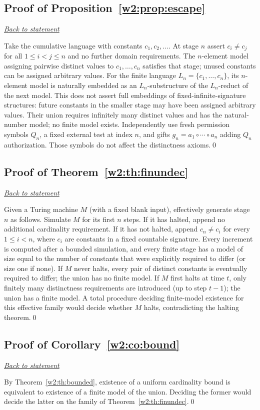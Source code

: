 \documentclass[11pt,letterpaper]{article}
\theoremstyle{definition}\newtheorem{definition}[theorem]{Definition}\newtheorem{example}[theorem]{Example}
\theoremstyle{remark}\newtheorem{remark}[theorem]{Remark}
\newcommand{\backlink}[1]{\noindent\hyperref[#1]{\textit{Back to statement}}\par\smallskip}
\begin{document}
\subsection{Proof of Proposition~\ref{w2:prop:escape}}\label{w2:pr:escape}\backlink{w2:prop:escape}
Take the cumulative language with constants $c_1,c_2,\dots$. At stage $n$ assert $c_i\ne c_j$ for all $1\le i<j\le n$ and no further domain requirements. The $n$-element model assigning pairwise distinct values to $c_1,\dots,c_n$ satisfies that stage; unused constants can be assigned arbitrary values. For the finite language $L_n=\{c_1,\dots,c_n\}$, its $n$-element model is naturally embedded as an $L_n$-substructure of the $L_n$-reduct of the next model. This does not assert full embeddings of fixed-infinite-signature structures: future constants in the smaller stage may have been assigned arbitrary values. Their union requires infinitely many distinct values and has the natural-number model; no finite model exists. Independently use fresh permission symbols $Q_n$, a fixed external test at index $n$, and gifts $g_n=a_1\circ\cdots\circ a_n$ adding $Q_n$ authorization. Those symbols do not affect the distinctness axioms.\qed

\subsection{Proof of Theorem~\ref{w2:th:finundec}}\label{w2:pr:finundec}\backlink{w2:th:finundec}
Given a Turing machine $M$ (with a fixed blank input), effectively generate stage $n$ as follows. Simulate $M$ for its first $n$ steps. If it has halted, append no additional cardinality requirement. If it has not halted, append $c_n\ne c_i$ for every $1\le i<n$, where $c_i$ are constants in a fixed countable signature. Every increment is computed after a bounded simulation, and every finite stage has a model of size equal to the number of constants that were explicitly required to differ (or size one if none). If $M$ never halts, every pair of distinct constants is eventually required to differ; the union has no finite model. If $M$ first halts at time $t$, only finitely many distinctness requirements are introduced (up to step $t-1$); the union has a finite model. A total procedure deciding finite-model existence for this effective family would decide whether $M$ halts, contradicting the halting theorem.\qed

\subsection{Proof of Corollary~\ref{w2:co:bound}}\label{w2:pr:bound}\backlink{w2:co:bound}
By Theorem~\ref{w2:th:bounded}, existence of a uniform cardinality bound is equivalent to existence of a finite model of the union. Deciding the former would decide the latter on the family of Theorem~\ref{w2:th:finundec}.\qed
\end{document}
